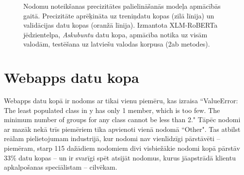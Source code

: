 \begin{figure}[h] 
   \centering
   \caption{Nodomu noteikšanas precizitātes palielināšanās modeļa apmācībās gaitā. Precizitāte aprēķināta uz treniņdatu kopas (zilā līnija) un validācijas datu kopas (oranžā līnija). Izmantota XLM-RoBERTa jēdzientelpa, \textit{Askubuntu} datu kopa, apmācība notika uz visām valodām, testēšana uz latviešu valodas korpusa (2ab metodes).} 
   \label{fig:askubuntu-xlm-all}
\end{figure}



\section{Webapps datu kopa}


Webapps datu kopā ir nodoms ar tikai vienu piemēru, kas izraisa “ValueError: The least populated class in y has only 1 member, which is too few. The minimum number of groups for any class cannot be less than 2." Tāpēc nodomi ar mazāk nekā trīs piemēriem tika apvienoti vienā nodomā “Other". Tas atbilst reālam pielietojumam industrijā, kur nodomi nav vienlīdzīgi pārstāvēti  -- piemēram, starp 115 dažādiem nodomiem divi visbiežākie nodomi kopā pārstāv 33\% datu kopas \cite{paikens2020} -- un ir svarīgi spēt atsijāt nodomus, kurus jāapstrādā klientu apkalpošanas speciālistam -- cilvēkam.

